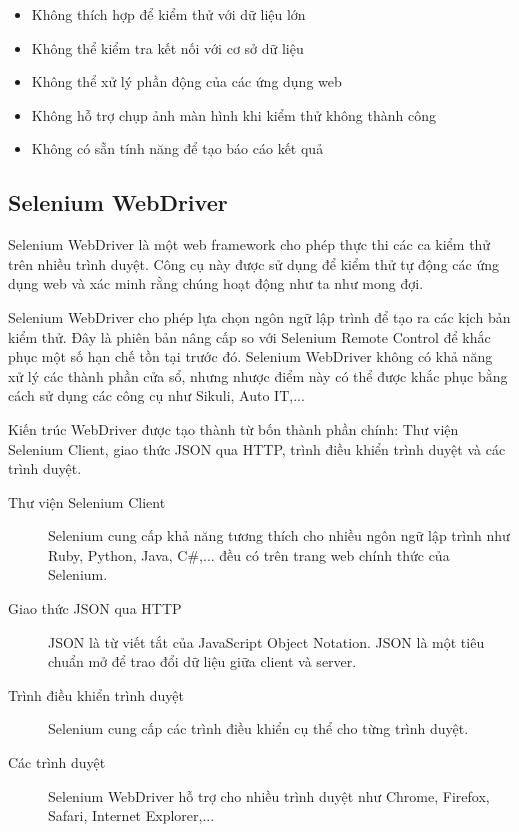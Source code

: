 \documentclass[./../main_file.tex]{subfiles}
\begin{document}
	\begin{itemize}
		\item Không thích hợp để kiểm thử với dữ liệu lớn
		\item Không thể kiểm tra kết nối với cơ sở dữ liệu
		\item Không thể xử lý phần động của các ứng dụng web
		\item Không hỗ trợ chụp ảnh màn hình khi kiểm thử không thành công
		\item Không có sẵn tính năng để tạo báo cáo kết quả
	\end{itemize}
	
	\subsection{Selenium WebDriver}
	
	Selenium WebDriver là một web framework cho phép thực thi các ca kiểm thử trên nhiều trình duyệt. Công cụ này được sử dụng để kiểm thử tự động các ứng dụng web và  xác minh rằng chúng hoạt động như ta như mong đợi.
	
	Selenium WebDriver cho phép lựa chọn ngôn ngữ lập trình để tạo ra các kịch bản kiểm thử. Đây là phiên bản nâng cấp so với Selenium Remote Control để khắc phục một số hạn chế tồn tại trước đó. Selenium WebDriver không có khả năng xử lý các thành phần cửa sổ, nhưng nhược điểm này có thể được khắc phục bằng cách sử dụng các công cụ như Sikuli, Auto IT,...
	
	Kiến trúc WebDriver được tạo thành từ bốn thành phần chính: Thư viện Selenium Client, giao thức JSON qua HTTP, trình điều khiển trình duyệt và các trình duyệt.

	\begin{description}
		\item[Thư viện Selenium Client] Selenium cung cấp khả năng tương thích cho nhiều ngôn ngữ lập trình như Ruby, Python, Java, C\#,... đều có trên trang web chính thức của Selenium.
		\item[Giao thức JSON qua HTTP] JSON là từ viết tắt của JavaScript Object Notation. JSON là một tiêu chuẩn mở để trao đổi dữ liệu giữa client và server.
		\item[Trình điều khiển trình duyệt] Selenium cung cấp các trình điều khiển cụ thể cho từng trình duyệt.
		\item[Các trình duyệt] Selenium WebDriver hỗ trợ cho nhiều trình duyệt như Chrome, Firefox, Safari, Internet Explorer,...
	\end{description}
\end{document}
